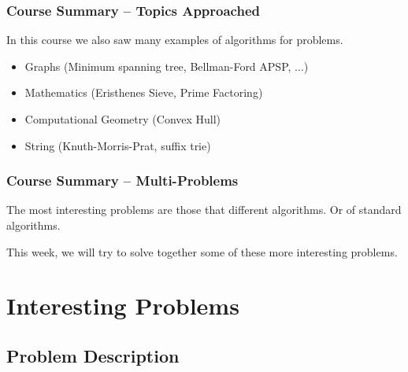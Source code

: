 \documentclass{beamer}
\begin{document}
\begin{frame}
  \frametitle{Course Summary -- Topics Approached}

  {\smaller
    \begin{exampleblock}{}
      In this course we also saw many examples of 
      algorithms for problems.
    \end{exampleblock}

    \vfill

    \begin{itemize}
    \item Graphs (Minimum spanning tree, Bellman-Ford APSP, $\ldots$)
    \item Mathematics (Eristhenes Sieve, Prime Factoring)
    \item Computational Geometry (Convex Hull)
    \item String (Knuth-Morris-Prat, suffix trie)
    \end{itemize}
    
  }
\end{frame}

\begin{frame}
  \frametitle{Course Summary -- Multi-Problems}

  The most interesting problems are those that  different algorithms. Or  of
  standard algorithms.

  \bigskip

  This week, we will try to solve together some of these more
  interesting problems.
\end{frame}

\section{Interesting Problems}
\subsection{Problem Description}
\end{document}
